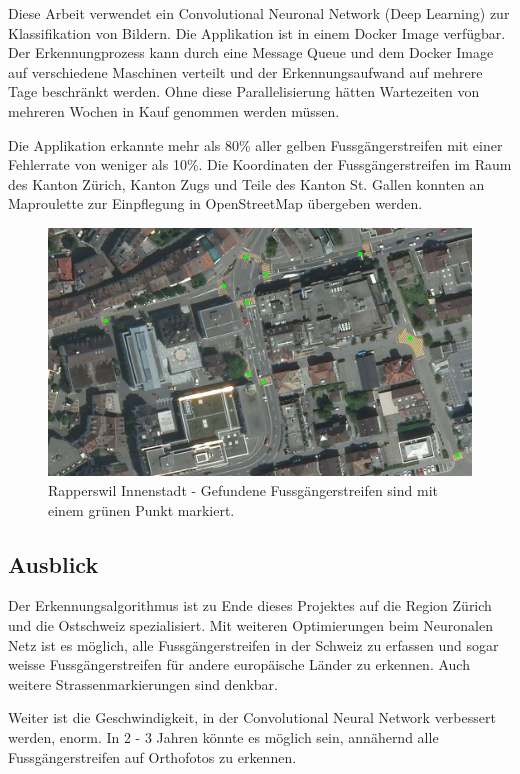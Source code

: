 Diese Arbeit verwendet ein Convolutional Neuronal Network (Deep Learning) zur Klassifikation von Bildern. Die Applikation ist in einem Docker Image verfügbar. Der Erkennungprozess kann durch eine Message Queue und dem Docker Image auf verschiedene Maschinen verteilt und der Erkennungsaufwand auf mehrere Tage beschränkt werden. Ohne diese Parallelisierung hätten Wartezeiten von mehreren Wochen in Kauf genommen werden müssen.

Die Applikation erkannte mehr als 80\% aller gelben Fussgängerstreifen mit einer Fehlerrate von weniger als 10\%. Die Koordinaten der Fussgängerstreifen im Raum des Kanton Zürich, Kanton Zugs und Teile des Kanton St. Gallen konnten an Maproulette zur Einpflegung in OpenStreetMap übergeben werden.
\\
\begin{figure}[H]
	\centering
	\includegraphics[width=\textwidth -10mm]{images/boxsave_rappi.png}
	\caption[Überblick]{Rapperswil Innenstadt - Gefundene Fussgängerstreifen sind mit einem grünen Punkt markiert.}
\end{figure}

\subsection*{Ausblick}
Der Erkennungsalgorithmus ist zu Ende dieses Projektes auf die Region Zürich und die Ostschweiz spezialisiert. Mit weiteren Optimierungen beim Neuronalen Netz ist es möglich, alle Fussgängerstreifen in der Schweiz zu erfassen und sogar weisse Fussgängerstreifen für andere europäische Länder zu erkennen. Auch weitere Strassenmarkierungen sind denkbar.

Weiter ist die Geschwindigkeit, in der Convolutional Neural Network verbessert werden, enorm. In 2 - 3 Jahren könnte es möglich sein, annähernd alle Fussgängerstreifen auf Orthofotos zu erkennen.
\newpage